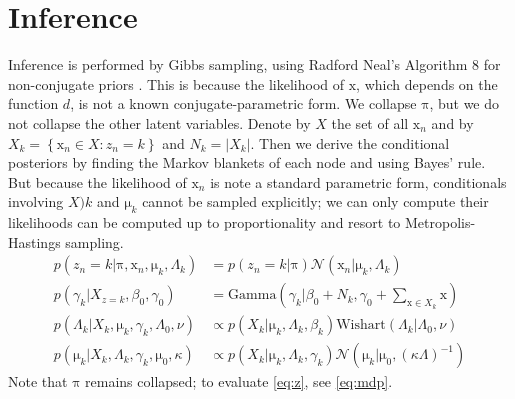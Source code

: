 \documentclass[english]{article}
\newcommand{\+}[1]{\ensuremath{\boldsymbol{\mathrm{#1}}}}
\begin{document}
\section{Inference}
Inference is performed by Gibbs sampling, using Radford Neal's Algorithm 8 for non-conjugate priors \cite{Neal2000}. This is because the likelihood of $\+x$, which depends on the function $d$, is not a known conjugate-parametric form. We collapse $\+\pi$, but we do not collapse the other latent variables. Denote by $X$ the set of all $\+x_n$ and by $X_k = \left\{ \+x_n \in X : z_n = k \right\}$ and $N_k = | X_k |$. Then we derive the conditional posteriors by finding the Markov blankets of each node and using Bayes' rule. But because the likelihood of $\+x_n$ is note a standard parametric form, conditionals involving $X)k$ and $\+\mu_k$ cannot be sampled explicitly; we can only compute their likelihoods can be computed up to proportionality and resort to Metropolis-Hastings sampling.
\begin{align}\label{eq:conds}
p(z_n = k | \+\pi, \+x_n, \+\mu_k, \Lambda_k) &= p(z_n = k | \+\pi) \mathcal{N}(\+x_n | \+\mu_k, \Lambda_k) \label{eq:z}\\
p(\gamma_k | X_{z=k} , \beta_0, \gamma_0) &= \text{Gamma}\left( \gamma_k | \beta_0 + N_k, \gamma_0 + \sum_{\+x \in X_k} \+x \right) \label{eq:gamma}\\
p(\Lambda_k | X_k, \+\mu_k, \gamma_k, \Lambda_0, \nu) &\propto  p(X_k | \+\mu_k, \Lambda_k, \beta_k) \text{Wishart}(\Lambda_k | \Lambda_0, \nu) \label{eq:lambda}\\
p(\+\mu_k | X_k, \Lambda_k, \gamma_k, \+\mu_0, \kappa) &\propto p(X_k | \+\mu_k, \Lambda_k, \gamma_k) \mathcal{N}(\+\mu_k | \+\mu_0, (\kappa\Lambda)^{-1}) \label{eq:mu}
\end{align}
Note that $\+\pi$ remains collapsed; to evaluate \eqref{eq:z}, see \eqref{eq:mdp}.
\end{document}

